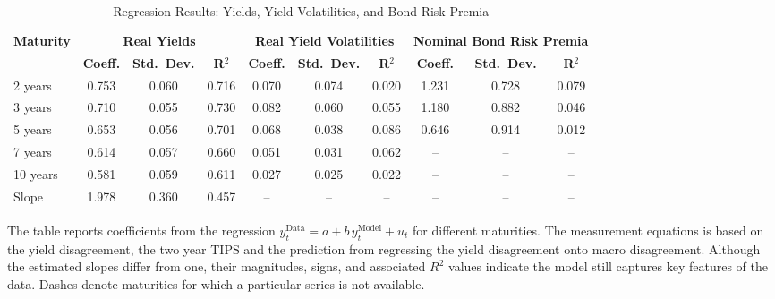 \begin{landscape}
\begin{table}[H]
    \centering
    \begin{tabular}{lccccccccc}
        \toprule
        \multirow{2}{*}{\textbf{Maturity}} &
            \multicolumn{3}{c}{\textbf{Real Yields}} &
            \multicolumn{3}{c}{\textbf{Real Yield Volatilities}} &
            \multicolumn{3}{c}{\textbf{Nominal Bond Risk Premia}} \\
        \cmidrule(lr){2-4}\cmidrule(lr){5-7}\cmidrule(lr){8-10}
        & \textbf{Coeff.} & \textbf{Std.\ Dev.} & \textbf{R$^2$} 
        & \textbf{Coeff.} & \textbf{Std.\ Dev.} & \textbf{R$^2$} 
        & \textbf{Coeff.} & \textbf{Std.\ Dev.} & \textbf{R$^2$} \\
        \midrule
        2 years  & 0.753 & 0.060 & 0.716 & 0.070 & 0.074 & 0.020 & 1.231 & 0.728 & 0.079 \\
        3 years  & 0.710 & 0.055 & 0.730 & 0.082 & 0.060 & 0.055 & 1.180 & 0.882 & 0.046 \\
        5 years  & 0.653 & 0.056 & 0.701 & 0.068 & 0.038 & 0.086 & 0.646 & 0.914 & 0.012 \\
        7 years  & 0.614 & 0.057 & 0.660 & 0.051 & 0.031 & 0.062 & --    & --    & --    \\
        10 years & 0.581 & 0.059 & 0.611 & 0.027 & 0.025 & 0.022 & --    & --    & --    \\
        Slope    & 1.978 & 0.360 & 0.457 & --    & --    & --    & --    & --    & --    \\
        \bottomrule
    \end{tabular}
    \vspace{0.5em}
    \caption{Regression Results: Yields, Yield Volatilities, and Bond Risk Premia}
    \label{table:NewUKFOOS}
    \begin{minipage}{0.95\textwidth}
        \footnotesize
        The table reports coefficients from the regression 
        $y^{\text{Data}}_t = a + b\,y^{\text{Model}}_t + u_t$
        for different maturities. The measurement equations is based on the yield disagreement, the two year TIPS and the prediction from regressing the yield disagreement onto macro disagreement. Although the estimated slopes differ from one, their magnitudes,
        signs, and associated $R^2$ values indicate the model still captures key features of the data.
        Dashes denote maturities for which a particular series is not available.
    \end{minipage}
\end{table}
\end{landscape}

